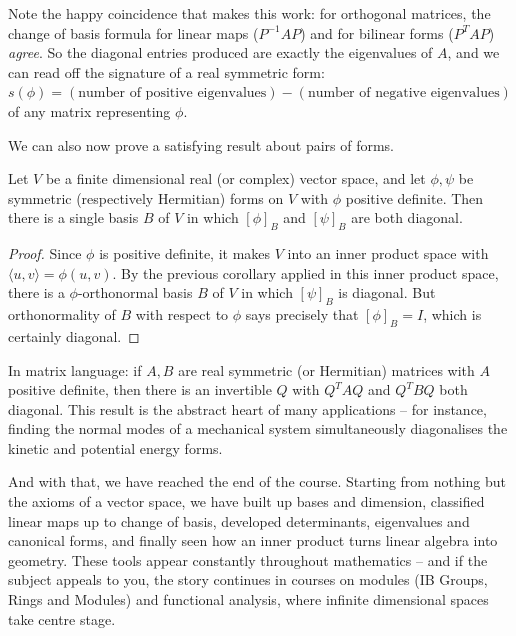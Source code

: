 \documentclass[a4paper]{scrartcl}
\begin{document}
Note the happy coincidence that makes this work: for orthogonal matrices, the change of basis formula for linear maps ($P^{-1}AP$) and for bilinear forms ($P^TAP$) \emph{agree}. So the diagonal entries produced are exactly the eigenvalues of $A$, and we can read off the signature of a real symmetric form: $s(\phi) = (\text{number of positive eigenvalues}) - (\text{number of negative eigenvalues})$ of any matrix representing $\phi$.

We can also now prove a satisfying result about pairs of forms.

\begin{corollary}
    Let $V$ be a finite dimensional real (or complex) vector space, and let $\phi, \psi$ be symmetric (respectively Hermitian) forms on $V$ with $\phi$ positive definite. Then there is a single basis $B$ of $V$ in which $[\phi]_B$ and $[\psi]_B$ are both diagonal.
\end{corollary}
\begin{proof}
    Since $\phi$ is positive definite, it makes $V$ into an inner product space with $\langle u, v\rangle = \phi(u, v)$. By the previous corollary applied in this inner product space, there is a $\phi$-orthonormal basis $B$ of $V$ in which $[\psi]_B$ is diagonal. But orthonormality of $B$ with respect to $\phi$ says precisely that $[\phi]_B = I$, which is certainly diagonal.
\end{proof}

In matrix language: if $A, B$ are real symmetric (or Hermitian) matrices with $A$ positive definite, then there is an invertible $Q$ with $Q^TAQ$ and $Q^TBQ$ both diagonal. This result is the abstract heart of many applications -- for instance, finding the normal modes of a mechanical system simultaneously diagonalises the kinetic and potential energy forms.

And with that, we have reached the end of the course. Starting from nothing but the axioms of a vector space, we have built up bases and dimension, classified linear maps up to change of basis, developed determinants, eigenvalues and canonical forms, and finally seen how an inner product turns linear algebra into geometry. These tools appear constantly throughout mathematics -- and if the subject appeals to you, the story continues in courses on modules (IB Groups, Rings and Modules) and functional analysis, where infinite dimensional spaces take centre stage.
\end{document}
